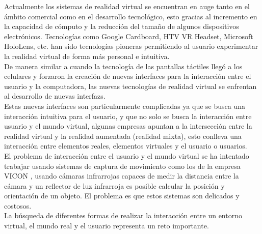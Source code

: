 Actualmente los sistemas de \gls{realidad virtual} se encuentran en auge tanto en el ámbito comercial como en el desarrollo tecnológico, esto gracias al incremento en la capacidad de cómputo y la reducción del tamaño de algunos dispositivos electrónicos. Tecnologías como Google Cardboard, HTV VR Headset, Microsoft HoloLens, etc. han sido tecnologías pioneras permitiendo al usuario experimentar la realidad virtual de forma más personal e intuitiva.\\

De manera similar a cuando la tecnología de las pantallas táctiles llegó a los celulares y forzaron la creación de nuevas interfaces para la interacción entre el usuario y la computadora, las nuevas tecnologías de realidad virtual se enfrentan al desarrollo de nuevas \glspl{interfaz}.\\

Estas nuevas interfaces son particularmente complicadas ya que se busca una interacción intuitiva para el usuario, y que no solo se busca la interacción entre usuario y el mundo virtual, algunas empresas apuntan a la intersección entre la realidad virtual y la realidad aumentada (realidad mixta), esto conlleva una interacción entre elementos reales, elementos virtuales y el usuario o usuarios.\\

El problema de interacción entre el usuario y el mundo virtual se ha intentado trabajar usando sistemas de captura de movimiento como los de la empresa VICON \cite{vicon}, usando cámaras infrarrojas capaces de medir la distancia entre la cámara y un reflector de luz infrarroja es posible calcular la posición y orientación de un objeto. El problema es que estos sistemas son delicados y costosos.\\

La búsqueda de diferentes formas de realizar la interacción entre un entorno virtual, el mundo real y el usuario representa un reto importante.\\



